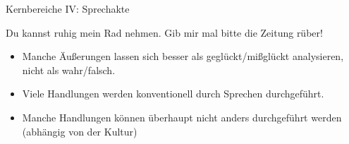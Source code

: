 \begin{frame}{Kernbereiche IV: Sprechakte}

\begin{exe}
\ex 
  \begin{xlist}
    \ex  Du kannst ruhig mein Rad nehmen.
    \ex  Gib mir mal bitte die Zeitung rüber!
  \end{xlist}

\end{exe}

  \begin{itemize}[<+->]
  \item Manche Äußerungen lassen sich besser als geglückt/mißglückt analysieren,\\
        nicht als wahr/falsch.
  \item<2-> Viele Handlungen werden konventionell durch Sprechen durchgeführt.
  \item<3-> Manche Handlungen können überhaupt nicht anders durchgeführt werden (abhängig von der Kultur)
  \end{itemize}


\end{frame}




